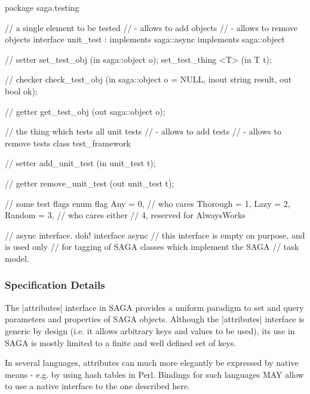  \begin{myspec}
  package saga.testing
  {
    // a single element to be tested
    //    - allows to add objects
    //    - allows to remove objects
    interface unit_test : implements saga::async
                          implements saga::object
    {
      // setter
      set_test_obj            (in  saga::object o);
      set_test_thing <T>      (in  T            t);

      // checker
      check_test_obj          (in    saga::object o = NULL, 
                               inout string       result,
                               out   bool         ok);

      // getter
      get_test_obj            (out saga::object o);
    }

    // the thing which tests all unit tests
    //    - allows to add tests
    //    - allows to remove tests
    class test_framework
    {
      // setter
      add_unit_test           (in  unit_test    t);

      // getter
      remove_unit_test        (out unit_test    t);
    }

    // some test flags
    enum flag
    {
      Any      = 0,  // who cares
      Thorough = 1,
      Lazy     = 2,
      Random   = 3,  // who cares either 
   //            4, reserved for AlwaysWorks
    }

    // async interface.  doh!
    interface async
    {
      // this interface is empty on purpose, and is used only
      // for tagging of SAGA classes which implement the SAGA
      // task model.
    }
  }
 \end{myspec}
 
 \subsubsection{Specification Details}
 
  The |attributes| interface in SAGA provides a uniform paradigm
  to set and query parameters and properties of SAGA objects.
  Although the |attributes| interface is generic by design (i.e.
  it allows arbitrary keys and values to be used), its use in
  SAGA is mostly limited to a finite and well defined set of
  keys.
 
  In several languages, attributes can much more elegantly
  be expressed by native means - e.g. by using hash
  tables in Perl.  Bindings for such languages MAY allow to use
  a native interface  to the one described here.
 
